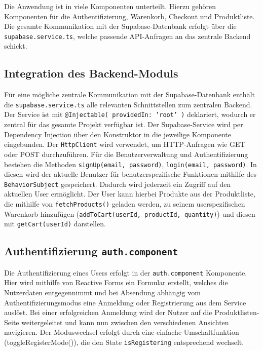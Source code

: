 \documentclass[oneside]{ausarbeitung}
\begin{document}
Die Anwendung ist in viele Komponenten unterteilt. Hierzu gehören Komponenten für die Authentifizierung, Warenkorb, Checkout und Produktliste. Die gesamte Kommunikation mit der Supabase-Datenbank erfolgt über die \texttt{supabase.service.ts}, welche passende API-Anfragen an das zentrale Backend schickt.

\subsection{Integration des Backend-Moduls}

Für eine mögliche zentrale Kommunikation mit der Supabase-Datenbank enthält die \texttt{supabase.service.ts} alle relevanten Schnittstellen zum zentralen Backend.
Der Service ist mit \texttt{@Injectable({ providedIn: 'root' })} deklariert, wodurch er zentral für das gesamte Projekt verfügbar ist. Der Supabase-Service wird per Dependency Injection über den Konstruktor in die jeweilige Komponente eingebunden. Der \texttt{HttpClient} wird verwendet, um \ac{HTTP}-Anfragen wie GET oder POST durchzuführen. Für die Benutzerverwaltung und Authentifizierung bestehen die Methoden \texttt{signUp(email, password)}, \texttt{login(email, password)}. In diesen wird der aktuelle Benutzer für benutzerspezifische Funktionen mithilfe des \texttt{BehaviorSubject} gespeichert. Dadurch wird jederzeit ein Zugriff auf den aktuellen User ermöglicht. Der User kann hierbei Produkte aus der Produktliste, die mithilfe von \texttt{fetchProducts()} geladen werden, zu seinem userspezifischen Warenkorb hinzufügen (\texttt{addToCart(userId, productId, quantity)}) und diesen mit \texttt{getCart(userId)} darstellen.

\subsection{Authentifizierung \texttt{auth.component}}

Die Authentifizierung eines Users erfolgt in der \texttt{auth.component} Komponente. Hier wird mithilfe von Reactive Forms ein Formular erstellt, welches die Nutzerdaten entgegennimmt und bei Absendung abhängig vom Authentifizierungsmodus eine Anmeldung oder Registrierung aus dem Service auslöst. Bei einer erfolgreichen Anmeldung wird der Nutzer auf die Produktlisten-Seite weitergeleitet und kann nun zwischen den verschiedenen Ansichten navigieren. Der Moduswechsel erfolgt durch eine einfache Umschaltfunktion (toggleRegisterMode()), die den State \texttt{isRegistering} entsprechend wechselt.
\end{document}
